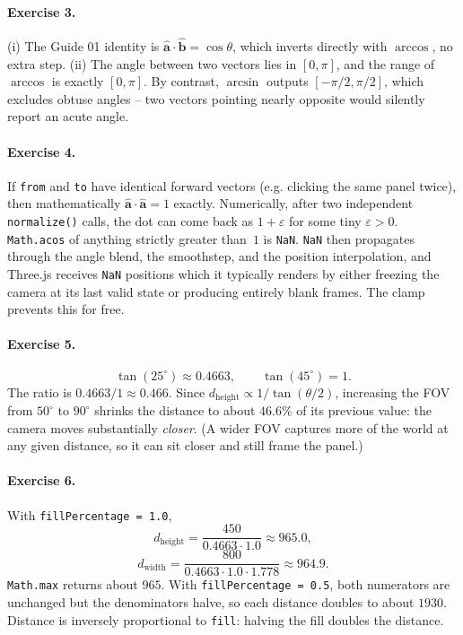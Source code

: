 \documentclass{article}
\begin{document}
\paragraph{Exercise 3.} (i) The Guide 01 identity is
$\hat{\mathbf{a}} \cdot \hat{\mathbf{b}} = \cos\theta$, which inverts directly
with $\arccos$, no extra step. (ii) The angle between two vectors lies in
$[0, \pi]$, and the range of $\arccos$ is exactly $[0, \pi]$. By contrast,
$\arcsin$ outputs $[-\pi/2, \pi/2]$, which excludes obtuse angles -- two
vectors pointing nearly opposite would silently report an acute angle.

\paragraph{Exercise 4.} If \lstinline{from} and \lstinline{to} have identical
forward vectors (e.g. clicking the same panel twice), then mathematically
$\hat{\mathbf{a}} \cdot \hat{\mathbf{a}} = 1$ exactly. Numerically, after two
independent \lstinline{normalize()} calls, the dot can come back as
$1 + \varepsilon$ for some tiny $\varepsilon > 0$. \lstinline{Math.acos} of
anything strictly greater than~$1$ is \lstinline{NaN}.
\lstinline{NaN} then propagates through the angle blend, the smoothstep, and
the position interpolation, and Three.js receives \lstinline{NaN} positions
which it typically renders by either freezing the camera at its last valid
state or producing entirely blank frames. The clamp prevents this for free.

\paragraph{Exercise 5.}
\[
  \tan(25^\circ) \approx 0.4663, \qquad \tan(45^\circ) = 1.
\]
The ratio is $0.4663 / 1 \approx 0.466$. Since
$d_{\text{height}} \propto 1/\tan(\theta/2)$, increasing the FOV from $50^\circ$
to $90^\circ$ shrinks the distance to about $46.6\%$ of its previous value:
the camera moves substantially \emph{closer}. (A wider FOV captures more of the
world at any given distance, so it can sit closer and still frame the panel.)

\paragraph{Exercise 6.} With \lstinline{fillPercentage = 1.0},
\[
  d_{\text{height}} = \frac{450}{0.4663 \cdot 1.0} \approx 965.0,
\]
\[
  d_{\text{width}} = \frac{800}{0.4663 \cdot 1.0 \cdot 1.778} \approx 964.9.
\]
\lstinline{Math.max} returns about $965$. With
\lstinline{fillPercentage = 0.5}, both numerators are unchanged but the
denominators halve, so each distance doubles to about $1930$. Distance is
inversely proportional to \lstinline{fill}: halving the fill doubles the
distance.
\end{document}
